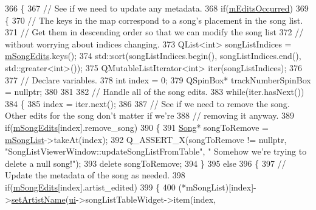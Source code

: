 \begin{DoxyCode}
366 \{
367     \textcolor{comment}{// See if we need to update any metadata.}
368     \textcolor{keywordflow}{if}(\mbox{\hyperlink{class_song_list_viewer_window_a939acaa75e8260232852266a5891fb5f}{mEditsOccurred}})
369     \{
370         \textcolor{comment}{// The keys in the map correspond to a song's placement in the song list.}
371         \textcolor{comment}{// Get them in descending order so that we can modify the song list}
372         \textcolor{comment}{// without worrying about indices changing.}
373         QList<int> songListIndices = \mbox{\hyperlink{class_song_list_viewer_window_aa38d8a91dc7ebe0925602b3846c34fdc}{mSongEdits}}.keys();
374         std::sort(songListIndices.begin(), songListIndices.end(), std::greater<int>());
375         QMutableListIterator<int> iter(songListIndices);
376 
377         \textcolor{comment}{// Declare variables.}
378         \textcolor{keywordtype}{int} index = 0;
379         QSpinBox* trackNumberSpinBox = \textcolor{keyword}{nullptr};
380 
381 
382         \textcolor{comment}{// Handle all of the song edits.}
383         \textcolor{keywordflow}{while}(iter.hasNext())
384         \{
385             index = iter.next();
386 
387             \textcolor{comment}{// See if we need to remove the song. Other edits for the song don't matter if we're}
388             \textcolor{comment}{// removing it anyway.}
389             \textcolor{keywordflow}{if}(\mbox{\hyperlink{class_song_list_viewer_window_aa38d8a91dc7ebe0925602b3846c34fdc}{mSongEdits}}[index].remove\_song)
390             \{
391                 \mbox{\hyperlink{class_song}{Song}}* songToRemove = \mbox{\hyperlink{class_song_list_viewer_window_a02558cb095f356a1288e5663bc2e1955}{mSongList}}->takeAt(index);
392                 Q\_ASSERT\_X(songToRemove != \textcolor{keyword}{nullptr}, \textcolor{stringliteral}{"SongListViewerWindow::updateSongListFromTable"}, \textcolor{stringliteral}{"
      Somehow we're trying to delete a null song!"});
393                 \textcolor{keyword}{delete} songToRemove;
394             \}
395             \textcolor{keywordflow}{else}
396             \{
397                 \textcolor{comment}{// Update the metadata of the song as needed.}
398                 \textcolor{keywordflow}{if}(\mbox{\hyperlink{class_song_list_viewer_window_aa38d8a91dc7ebe0925602b3846c34fdc}{mSongEdits}}[index].artist\_edited)
399                 \{
400                     (*mSongList)[index]->\mbox{\hyperlink{class_song_ab071f31965057c073c4e25a846810f8d}{setArtistName}}(\mbox{\hyperlink{class_song_list_viewer_window_ac24fa09133b92a7b4cbd757f9b84258d}{ui}}->songListTableWidget->item(index, 

\end{DoxyCode}
